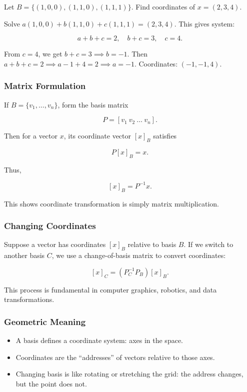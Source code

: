 \documentclass[
  letterpaper,
  DIV=11,
  numbers=noendperiod]{scrreprt}
\providecommand{\tightlist}{%
  \setlength{\itemsep}{0pt}\setlength{\parskip}{0pt}}
\begin{document}
Let \(B = \{(1,0,0), (1,1,0), (1,1,1)\}\). Find coordinates of
\(x = (2,3,4)\).

Solve \(a(1,0,0) + b(1,1,0) + c(1,1,1) = (2,3,4)\). This gives system:

\[
a+b+c = 2, \quad b+c = 3, \quad c = 4.
\]

From \(c=4\), we get \(b+c=3 \implies b=-1\). Then
\(a+b+c=2 \implies a-1+4=2 \implies a=-1\). Coordinates:
\((-1, -1, 4)\).

\subsubsection{Matrix Formulation}\label{matrix-formulation}

If \(B = \{v_1, \dots, v_n\}\), form the basis matrix

\[
P = [v_1 \ v_2 \ \dots \ v_n].
\]

Then for a vector \(x\), its coordinate vector \([x]_B\) satisfies

\[
P [x]_B = x.
\]

Thus,

\[
[x]_B = P^{-1}x.
\]

This shows coordinate transformation is simply matrix multiplication.

\subsubsection{Changing Coordinates}\label{changing-coordinates}

Suppose a vector has coordinates \([x]_B\) relative to basis \(B\). If
we switch to another basis \(C\), we use a change-of-basis matrix to
convert coordinates:

\[
[x]_C = (P_C^{-1} P_B) [x]_B.
\]

This process is fundamental in computer graphics, robotics, and data
transformations.

\subsubsection{Geometric Meaning}\label{geometric-meaning-6}

\begin{itemize}
\tightlist
\item
  A basis defines a coordinate system: axes in the space.
\item
  Coordinates are the ``addresses'' of vectors relative to those axes.
\item
  Changing basis is like rotating or stretching the grid: the address
  changes, but the point does not.
\end{itemize}
\end{document}
